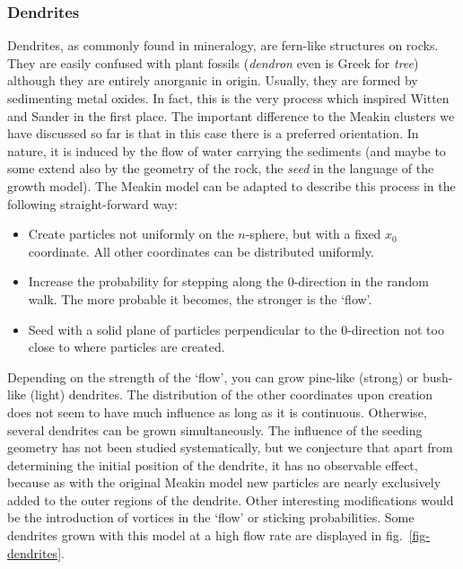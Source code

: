 \documentclass[twocolumn, 10pt]{scrartcl}
\begin{document}
            \subsubsection{Dendrites}
                Dendrites, as commonly found in mineralogy, are fern-like structures on rocks. They are easily confused
                with plant fossils (\emph{dendron} even is Greek for \emph{tree}) although they are entirely anorganic
                in origin. Usually, they are formed by sedimenting metal oxides. In fact, this is the very process
                which inspired Witten and Sander in the first place. The important difference to the Meakin clusters
                we have discussed so far is that in this case there is a preferred orientation. In nature, it is
                induced by the flow of water carrying the sediments (and maybe to some extend also by the geometry
                of the rock, the \emph{seed} in the language of the growth model). The Meakin model can be adapted
                to describe this process in the following straight-forward way:
                \begin{itemize}
                    \item Create particles not uniformly on the $n$-sphere, but with a fixed $x_0$ coordinate. All other
                        coordinates can be distributed uniformly.
                    \item Increase the probability for stepping along the 0-direction in the random walk. The more
                        probable it becomes, the stronger is the `flow'.
                    \item Seed with a solid plane of particles perpendicular to the 0-direction not too close to where
                        particles are created.
                \end{itemize}
                Depending on the strength of the `flow', you can grow pine-like (strong) or bush-like (light) dendrites.
                The distribution of the other coordinates upon creation does not seem to have much influence as long
                as it is continuous. Otherwise, several dendrites can be grown simultaneously. The influence of the
                seeding geometry has not been studied systematically, but we conjecture that apart from determining the
                initial position of the dendrite, it has no observable effect, because as with the original Meakin model
                new particles are nearly exclusively added to the outer regions of the dendrite. Other interesting
                modifications would be the introduction of vortices in the `flow' or sticking probabilities.
                Some dendrites grown with this model at a high flow rate are displayed in fig.~\ref{fig-dendrites}.
\end{document}

